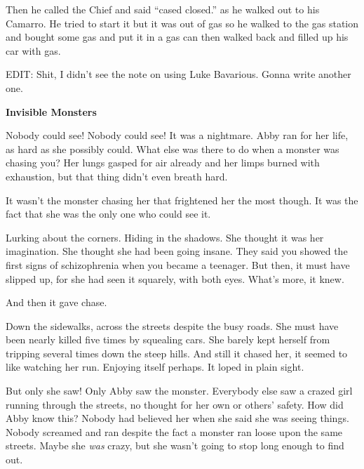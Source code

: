 Then he called the Chief and said ``cased closed.'' as he walked out
to his Camarro. He tried to start it but it was out of gas so he
walked to the gas station and bought some gas and put it in a gas
can then walked back and filled up his car with gas. 

 





EDIT: Shit, I didn't see the note on using Luke Bavarious. Gonna
write another one.



{\bf Invisible Monsters}



Nobody could see! Nobody could see! It was a nightmare. Abby ran
for her life, as hard as she possibly could. What else was there to
do when a monster was chasing you? Her lungs gasped for air already
and her limps burned with exhaustion, but that thing didn't even
breath hard.



It wasn't the monster chasing her that frightened her the most
though. It was the fact that she was the only one who could see
it.



Lurking about the corners. Hiding in the shadows. She thought it
was her imagination. She thought she had been going insane. They
said you showed the first signs of schizophrenia when you became a
teenager. But then, it must have slipped up, for she had seen it
squarely, with both eyes. What's more, it knew.



And then it gave chase.



Down the sidewalks, across the streets despite the busy roads. She
must have been nearly killed five times by squealing cars. She
barely kept herself from tripping several times down the steep
hills. And still it chased her, it seemed to like watching her run.
Enjoying itself perhaps. It loped in plain sight.



But only she saw! Only Abby saw the monster. Everybody else saw a
crazed girl running through the streets, no thought for her own or
others' safety. How did Abby know this? Nobody had believed her
when she said she was seeing things. Nobody screamed and ran
despite the fact a monster ran loose upon the same streets. Maybe
she {\em was} crazy, but she wasn't going to stop long enough to
find out.



